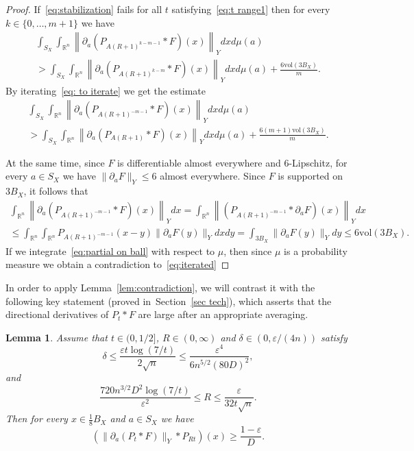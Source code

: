 \documentclass[12pt,reqno]{amsart}
\theoremstyle{plain}
\newtheorem{lemma}[theorem]{Lemma}
\theoremstyle{definition}
\newcommand{\e}{\varepsilon}
\renewcommand{\d}{\delta}
\renewcommand{\le}{\leqslant}
\renewcommand{\ge}{\geqslant}
\newcommand{\R}{\mathbb R}
\newcommand{\vol}{\mathrm{vol}}
\begin{document}
\begin{proof}
If~\eqref{eq:stabilization} fails for all $t$ satisfying~\eqref{eq:t range1} then for every $k\in \{0,\ldots,m+1\}$ we have
\begin{multline}\label{eq: to iterate}
\int_{S_X}\int_{\R^n} \left\|\partial_a\left(P_{A(R+1)^{k-m-1}}*F\right)(x)\right\|_Ydxd\mu(a)\\> \int_{S_X}\int_{\R^n} \left\|\partial_a\left(P_{A(R+1)^{k-m}}*F\right)(x)\right\|_Ydxd\mu(a)+\frac{6\vol(3B_X)}{m}.
\end{multline}
By iterating~\eqref{eq: to iterate} we get the estimate
\begin{multline}\label{eq:iterated}
\int_{S_X}\int_{\R^n} \left\|\partial_a\left(P_{A(R+1)^{-m-1}}*F\right)(x)\right\|_Ydxd\mu(a)\\> \int_{S_X}\int_{\R^n} \left\|\partial_a\left(P_{A(R+1)}*F\right)(x)\right\|_Ydxd\mu(a)+\frac{6(m+1)\vol(3B_X)}{m}.
\end{multline}

At the same time, since $F$ is differentiable almost everywhere and $6$-Lipschitz, for every $a\in S_X$ we have $\|\partial_aF\|_Y\le 6$ almost everywhere. Since $F$ is supported on $3B_X$, it follows that
\begin{multline}\label{eq:partial on ball}
\int_{\R^n} \left\|\partial_a\left(P_{A(R+1)^{-m-1}}*F\right)(x)\right\|_Ydx=\int_{\R^n} \left\|\left(P_{A(R+1)^{-m-1}}*\partial_a F\right)(x)\right\|_Ydx\\\le \int_{\R^n}\int_{\R^n}P_{A(R+1)^{-m-1}}(x-y)\|\partial_a F(y)\|_Y dxdy
=\int_{3B_X}\|\partial_aF(y)\|_Ydy \le 6\vol(3B_X).
\end{multline}
If we integrate~\eqref{eq:partial on ball} with respect to $\mu$, then since $\mu$ is a probability measure we obtain a contradiction to~\eqref{eq:iterated}
\end{proof}

In order to apply Lemma~\ref{lem:contradiction}, we will contrast it with the following key statement (proved in~Section~\ref{sec tech}), which asserts that the directional derivatives of $P_t*F$ are large after an appropriate averaging.
\begin{lemma}\label{lem:contrast}
Assume that $t\in (0,1/2]$, $R\in (0,\infty)$ and $\delta\in (0,\e/(4n))$ satisfy
\begin{equation}\label{eq:key assumption1}
\d\le \frac{\e t\log(7/t)}{2\sqrt{n}}\le \frac{\e^4}{6n^{5/2}(80D)^2},
\end{equation}
and
\begin{equation}\label{eq:def R}
\frac{720n^{3/2}D^2\log(7/t)}{\e^2}\le R\le \frac{\e}{32t\sqrt{n}}.
\end{equation}
Then for every $x\in \frac18 B_X$ and $a\in S_X$ we have
\begin{equation}\label{eq:directional}
\left(\|\partial_a(P_t*F)\|_Y*P_{Rt}\right)(x)\ge \frac{1-\e}{D}.
\end{equation}
\end{lemma}
\end{document}
